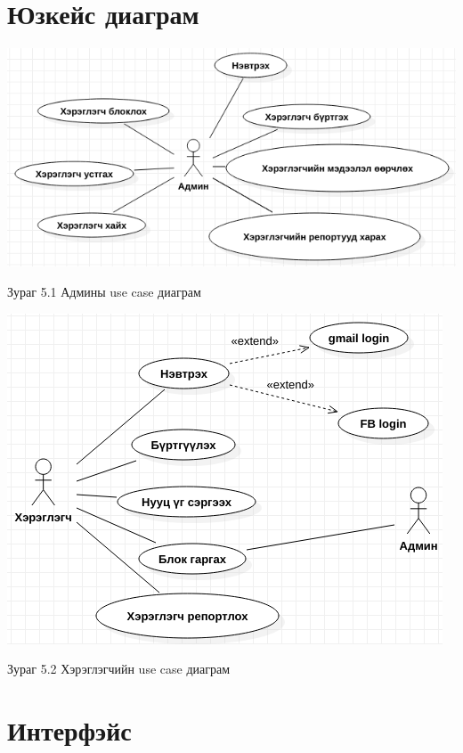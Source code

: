 \documentclass[
oneside, %
english, %
onehalfspacing, %
nolistspacing, %
headsepline, %
]{article} %
\begin{document}
	\section{Юзкейс диаграм}
     \includegraphics[width=\textwidth]{adUseCase}
     \centerline{Зураг 5.1 Админы use case диаграм}\newline \newline
     \includegraphics[width=\textwidth]{uUseCase}
     \centerline{Зураг 5.2 Хэрэглэгчийн use case диаграм}
     
     	\section{Интерфэйс}
\end{document}
